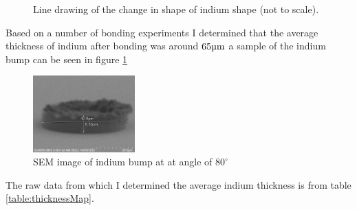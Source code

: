 \begin{figure}
    \centering
    \caption{Line drawing of the change in shape of indium shape (not to scale).}
\end{figure}


Based on a number of bonding experiments I determined that the average thickness of indium after bonding was around $65 \um$ a sample of the indium bump can be seen in figure \ref{fig:semIndium}

\begin{figure}
    \centering
    \includegraphics[width=0.35\textwidth]{Main/Ch2/indium_bump_before_bond.png}
    \caption{SEM image of indium bump at at angle of $80^\circ$}
    \label{fig:semIndium}
\end{figure}

The raw data from which I determined the average indium thickness is from table \ref{table:thicknessMap}.

